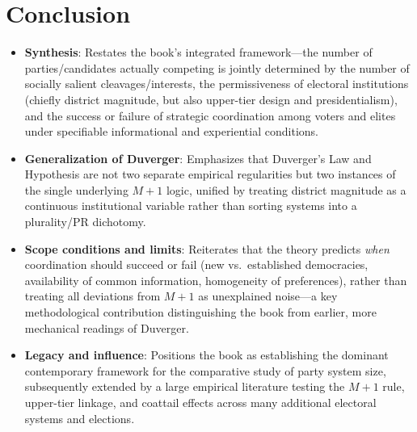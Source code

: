 \documentclass[12pt]{article}
\begin{document}
\section{Conclusion}

\begin{itemize}[leftmargin=*, itemsep=4pt]
    \item \textbf{Synthesis}: Restates the book's integrated framework---the number of parties/candidates actually competing is jointly determined by the number of socially salient cleavages/interests, the permissiveness of electoral institutions (chiefly district magnitude, but also upper-tier design and presidentialism), and the success or failure of strategic coordination among voters and elites under specifiable informational and experiential conditions.
    \item \textbf{Generalization of Duverger}: Emphasizes that Duverger's Law and Hypothesis are not two separate empirical regularities but two instances of the single underlying $M+1$ logic, unified by treating district magnitude as a continuous institutional variable rather than sorting systems into a plurality/PR dichotomy.
    \item \textbf{Scope conditions and limits}: Reiterates that the theory predicts \emph{when} coordination should succeed or fail (new vs.\ established democracies, availability of common information, homogeneity of preferences), rather than treating all deviations from $M+1$ as unexplained noise---a key methodological contribution distinguishing the book from earlier, more mechanical readings of Duverger.
    \item \textbf{Legacy and influence}: Positions the book as establishing the dominant contemporary framework for the comparative study of party system size, subsequently extended by a large empirical literature testing the $M+1$ rule, upper-tier linkage, and coattail effects across many additional electoral systems and elections.
\end{itemize}
\end{document}
